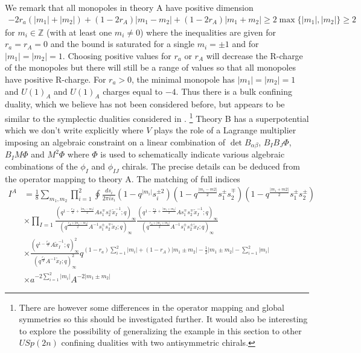 \documentclass[12pt]{article}
\newcommand{\Zb}{\mathbb{Z}}
\numberwithin{equation}{section}
\begin{document}
We remark that all monopoles in theory A have positive dimension
\begin{align}
\label{Mono_Ch_usp4_2_2}
   -2r_a(|m_1| + |m_2|) + (1 - 2r_A)|m_1 - m_2| + (1 - 2r_A)|m_1 + m_2| \ge 2\max \{|m_1|, |m_2| \} \ge 2
\end{align}
for $m_i \in \Zb$ (with at least one $m_i \ne 0$) where the inequalities are given for $r_a = r_A = 0$ and the bound is saturated for a single $m_i = \pm 1$ and for $|m_1| = |m_2| = 1$. Choosing positive values for $r_a$ or $r_A$ will decrease the R-charge of the monopoles but there will still be a range of values so that all monopoles have positive R-charge. For $r_a > 0$, the minimal monopole has $|m_1| = |m_2| = 1$ and $U(1)_A$ and $U(1)_A$ charges equal to $-4$.
Thus there is a bulk confining duality, which we believe has not been considered before, but appears to be similar to the symplectic dualities considered in \cite{Amariti:2022iaz}. \footnote{There are however some differences in the operator mapping and global symmetries so this should be investigated further. It would also be interesting to explore the possibility of generalizing the example in this section to other $USp(2n)$ confining dualities with two antisymmetric chirals.} Theory B has a superpotential which we don't write explicitly where $V$ plays the role of a Lagrange multiplier imposing an algebraic constraint on a linear combination of $\det B_{\alpha \beta}$, $B_I B_J \Phi$, $B_I M \Phi$ and $M^2 \Phi$ where $\Phi$ is used to schematically indicate various algebraic combinations of the $\phi_I$ and $\phi_{IJ}$ chirals. The precise details can be deduced from the operator mapping to theory A.
The matching of full indices 
\begin{align}
I^A&=
\frac{1}{8}\sum_{m_1,m_2}
\prod_{i=1}^2 
\oint  \frac{ds_i}{2\pi is_i}
(1-q^{|m_i|}s_i^{\pm 2})
(1-q^{\frac{|m_1-m2|}{2}}s_1^{\pm}s_2^{\mp})
(1-q^{\frac{|m_1+m2|}{2}}s_1^{\pm}s_2^{\pm})
\nonumber\\
&\times 
\prod_{I=1}
\frac{
(q^{1-\frac{r_A}{2}+\frac{|m_1-m_2|}{2}}As_1^{\mp}s_2^{\pm} \tilde{x}_{I}^{-1};q)_{\infty}
}
{
(q^{\frac{r_A+|m_1-m_2|}{2}}A^{-1}s_1^{\pm}s_2^{\mp} \tilde{x}_{I};q)_{\infty}
}
\frac{
(q^{1-\frac{r_A}{2}+\frac{|m_1+m_2|}{2}}As_1^{\mp}s_2^{\mp} \tilde{x}_{I}^{-1};q)_{\infty}
}
{
(q^{\frac{r_A+|m_1+m_2|}{2}}A^{-1}s_1^{\pm}s_2^{\pm} \tilde{x}_{I};q)_{\infty}
}
\nonumber\\
&\times 
\frac{
(q^{1-\frac{r_A}{2}}A \tilde{x}_{I}^{-1};q)_{\infty}^2
}
{
(q^{\frac{r_A}{2}}A^{-1} \tilde{x}_{I};q)_{\infty}^2
}
q^{(1-r_a)\sum_{i=1}^2|m_i|+(1-r_A)|m_1\pm m_2|-\frac12|m_1\pm m_2|-\sum_{i=1}^2|m_i|}
\nonumber\\
&\times 
a^{-2\sum_{i=1}^2|m_i|} A^{-2|m_1\pm m_2|}
\end{align}
\end{document}
